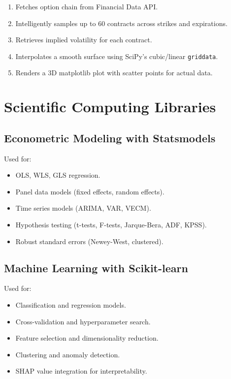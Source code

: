 \begin{enumerate}
  \item Fetches option chain from Financial Data API.
  \item Intelligently samples up to 60 contracts across strikes and expirations.
  \item Retrieves implied volatility for each contract.
  \item Interpolates a smooth surface using SciPy's cubic/linear \texttt{griddata}.
  \item Renders a 3D matplotlib plot with scatter points for actual data.
\end{enumerate}

\section{Scientific Computing Libraries}
\label{sec:modeling:libraries}

\subsection{Econometric Modeling with Statsmodels}

Used for:
\begin{itemize}
  \item OLS, WLS, GLS regression.
  \item Panel data models (fixed effects, random effects).
  \item Time series models (ARIMA, VAR, VECM).
  \item Hypothesis testing (t-tests, F-tests, Jarque-Bera, ADF, KPSS).
  \item Robust standard errors (Newey-West, clustered).
\end{itemize}

\subsection{Machine Learning with Scikit-learn}

Used for:
\begin{itemize}
  \item Classification and regression models.
  \item Cross-validation and hyperparameter search.
  \item Feature selection and dimensionality reduction.
  \item Clustering and anomaly detection.
  \item SHAP value integration for interpretability.
\end{itemize}

